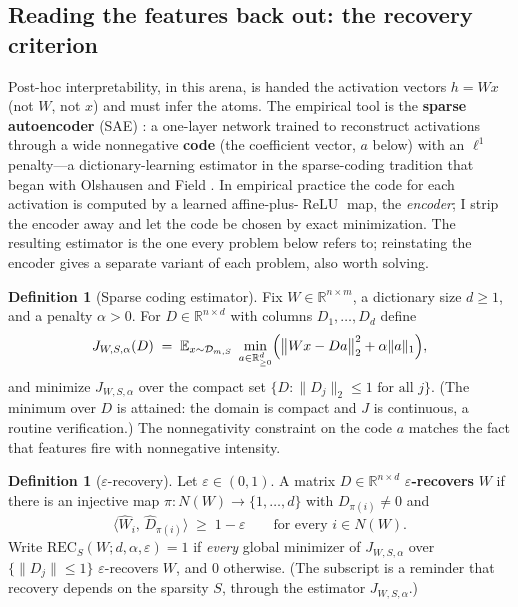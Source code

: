 \documentclass[11pt]{amsart}
\theoremstyle{plain}
\theoremstyle{definition}
\newtheorem{definition}[theorem]{Definition}
\DeclareMathOperator{\relu}{ReLU}
\newcommand{\E}{\mathbb{E}}
\newcommand{\R}{\mathbb{R}}
\begin{document}
\subsection{Reading the features back out: the recovery criterion}\label{sec:recovery}

Post-hoc interpretability, in this arena, is handed the activation vectors $h=Wx$ (not $W$, not $x$) and must infer the atoms. The empirical tool is the \textbf{sparse autoencoder} (SAE) \cite{bricken2023,cunningham2023}: a one-layer network trained to reconstruct activations through a wide nonnegative \textbf{code} (the coefficient vector, $a$ below) with an $\ell^1$ penalty---a dictionary-learning estimator in the sparse-coding tradition that began with Olshausen and Field \cite{olshausen1996}. In empirical practice the code for each activation is computed by a learned affine-plus-$\relu$ map, the \emph{encoder}; I strip the encoder away and let the code be chosen by exact minimization. The resulting estimator is the one every problem below refers to; reinstating the encoder gives a separate variant of each problem, also worth solving.

\begin{definition}[Sparse coding estimator]\label{def:sae}
Fix $W\in\R^{n\times m}$, a dictionary size $d\ge 1$, and a penalty $\alpha>0$. For $D\in\R^{n\times d}$ with columns $D_1,\dots,D_d$ define
\[
J_{W,S,\alpha}(D) \;=\; \E_{x\sim\mathcal D_{m,S}} \;\min_{a\in\R^d_{\ge0}} \Bigl( \bigl\|Wx - Da\bigr\|_2^2 + \alpha\|a\|_1 \Bigr),
\]
and minimize $J_{W,S,\alpha}$ over the compact set $\{D : \|D_j\|_2\le 1 \text{ for all } j\}$. (The minimum over $D$ is attained: the domain is compact and $J$ is continuous, a routine verification.) The nonnegativity constraint on the code $a$ matches the fact that features fire with nonnegative intensity.
\end{definition}

\begin{definition}[$\varepsilon$-recovery]\label{def:rec}
Let $\varepsilon\in(0,1)$. A matrix $D\in\R^{n\times d}$ \textbf{$\varepsilon$-recovers} $W$ if there is an injective map $\pi:N(W)\to\{1,\dots,d\}$ with $D_{\pi(i)}\neq 0$ and
\[
\bigl\langle \widehat W_i,\, \widehat D_{\pi(i)}\bigr\rangle \;\ge\; 1-\varepsilon \qquad\text{for every } i\in N(W).
\]
Write $\mathrm{REC}_S(W; d,\alpha,\varepsilon)=1$ if \emph{every} global minimizer of $J_{W,S,\alpha}$ over $\{\|D_j\|\le1\}$ $\varepsilon$-recovers $W$, and $0$ otherwise. (The subscript is a reminder that recovery depends on the sparsity $S$, through the estimator $J_{W,S,\alpha}$.)
\end{definition}
\end{document}
